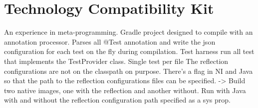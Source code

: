 



\section{Technology Compatibility Kit}\label{TCK}
An experience in meta-programming. 
Gradle project designed to compile with an annotation processor. Parses all @Test annotation and write the json configuration for each test on the fly
during compilation.
Test harness run all test that implements the TestProvider class. Single test per file
The reflection configurations are not on the classpath on purpose. There's a flag in NI and Java so that the path to the reflection configurations files can be specified.
-> Build two native images, one with the reflection and another without. Run with Java with and without the reflection configuration path specified as a sys prop.



